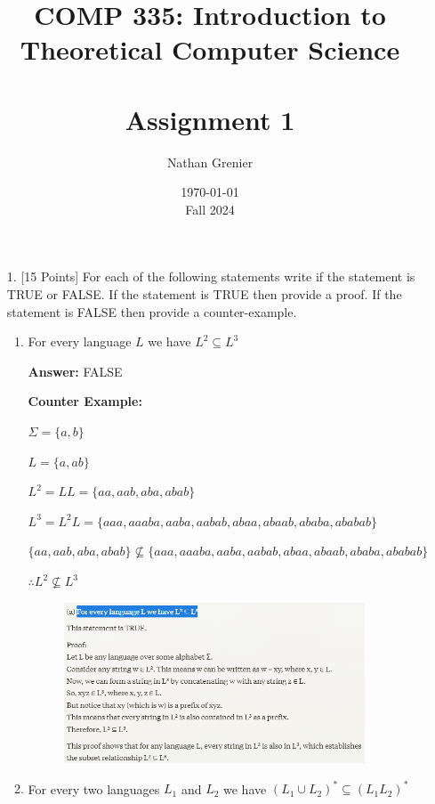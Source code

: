 \documentclass[12pt]{article}
\title{COMP 335: Introduction to Theoretical Computer Science\\
\ \\
Assignment 1}
\author{Nathan Grenier}
\date{\today \\ Fall 2024}
\begin{document}
\maketitle

\newpage

\begin{enumerate}

	\item[1.] [15 Points] For each of the following statements write if the statement is TRUE or FALSE. If the statement is TRUE then provide a proof. If the statement is FALSE then provide a counter-example.

	      \begin{enumerate}

		      \item For every language $L$ we have $L^2 \subseteq L^3$

		            \noindent \textbf{Answer:} FALSE

		            \noindent \textbf{Counter Example:}

		            $\Sigma = \{a,b \}$

		            $L=\{a, ab \}$

		            $L^2=LL=\{aa, aab, aba, abab \}$

		            $L^3=L^2L=\{aaa, aaaba, aaba, aabab, abaa, abaab, ababa, ababab \}$

		            $\{aa, aab, aba, abab \} \not\subseteq \{aaa, aaaba, aaba, aabab, abaa, abaab, ababa, ababab \}$

		            $\therefore L^2 \not\subseteq L^3$

		            \begin{figure}[h!]
			            \centering
			            \includegraphics[width=0.9\textwidth]{q1_a.png}
		            \end{figure}


		      \item For every two languages $L_1$ and $L_2$ we have $(L_1 \cup L_2)^* \subseteq (L_1L_2)^*$


\end{enumerate}
\end{enumerate}
\end{document}
